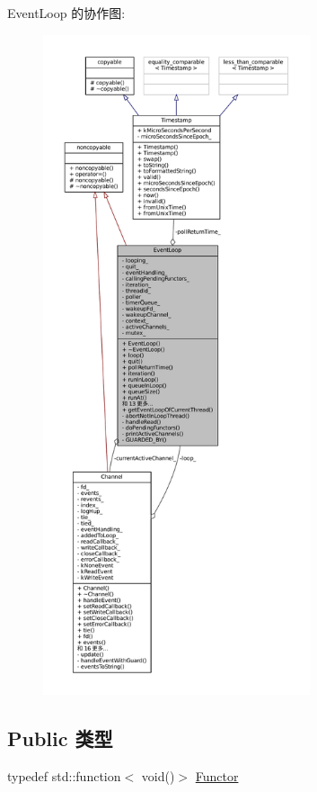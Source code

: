 Event\+Loop 的协作图\+:
\nopagebreak
\begin{figure}[H]
\begin{center}
\leavevmode
\includegraphics[height=550pt]{classmuduo_1_1net_1_1EventLoop__coll__graph}
\end{center}
\end{figure}
\subsection*{Public 类型}
\begin{DoxyCompactItemize}
\item 
typedef std\+::function$<$ void()$>$ \hyperlink{classmuduo_1_1net_1_1EventLoop_a322d335989ca5098875638110aafba84}{Functor}
\end{DoxyCompactItemize}
